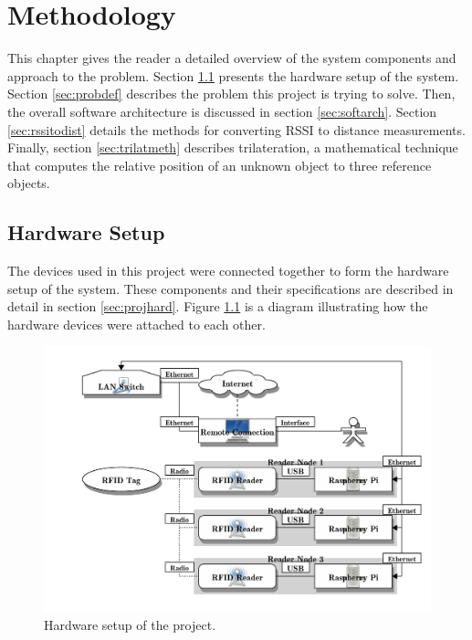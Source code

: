 \chapter{Methodology}
\label{ch:methodology}

This chapter gives the reader a detailed overview of the system components and approach to the problem. Section \ref{sec:hardset} presents the hardware setup of the system. Section \ref{sec:probdef} describes the problem this project is trying to solve. Then, the overall software architecture is discussed in section \ref{sec:softarch}. Section \ref{sec:rssitodist} details the methods for converting RSSI to distance measurements. Finally, section \ref{sec:trilatmeth} describes trilateration, a mathematical technique that computes the relative position of an unknown object to three reference objects.

\section{Hardware Setup}
\label{sec:hardset}

The devices used in this project were connected together to form the hardware setup of the system. These components and their specifications are described in detail in section \ref{sec:projhard}. Figure \ref{fig:hardset} is a diagram illustrating how the hardware devices were attached to each other.

\begin{figure}[h]
	\begin{center}
		\includegraphics[width=1\textwidth]{figures/blockdiag/hardwaredesign}
		\caption{Hardware setup of the project.}
		\label{fig:hardset}
	\end{center}
\end{figure}


